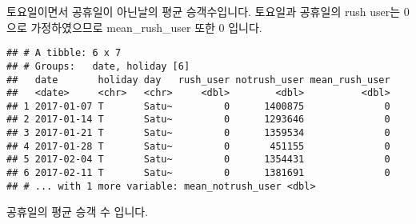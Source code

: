 \documentclass[]{article}
\newenvironment{Shaded}{\begin{snugshade}}{\end{snugshade}}
\newcommand{\KeywordTok}[1]{\textcolor[rgb]{0.13,0.29,0.53}{\textbf{#1}}}
\newcommand{\DataTypeTok}[1]{\textcolor[rgb]{0.13,0.29,0.53}{#1}}
\newcommand{\DecValTok}[1]{\textcolor[rgb]{0.00,0.00,0.81}{#1}}
\newcommand{\StringTok}[1]{\textcolor[rgb]{0.31,0.60,0.02}{#1}}
\newcommand{\OperatorTok}[1]{\textcolor[rgb]{0.81,0.36,0.00}{\textbf{#1}}}
\newcommand{\NormalTok}[1]{#1}
\begin{document}
토요일이면서 공휴일이 아닌날의 평균 승객수입니다. 토요일과 공휴일의 rush
user는 0으로 가정하였으므로 mean\_rush\_user 또한 0 입니다.

\begin{Shaded}
\end{Shaded}

\begin{verbatim}
## # A tibble: 6 x 7
## # Groups:   date, holiday [6]
##   date       holiday day   rush_user notrush_user mean_rush_user
##   <date>     <chr>   <chr>     <dbl>        <dbl>          <dbl>
## 1 2017-01-07 T       Satu~         0      1400875              0
## 2 2017-01-14 T       Satu~         0      1293646              0
## 3 2017-01-21 T       Satu~         0      1359534              0
## 4 2017-01-28 T       Satu~         0       451155              0
## 5 2017-02-04 T       Satu~         0      1354431              0
## 6 2017-02-11 T       Satu~         0      1381691              0
## # ... with 1 more variable: mean_notrush_user <dbl>
\end{verbatim}

공휴일의 평균 승객 수 입니다.

\begin{Shaded}
\end{Shaded}
\end{document}
